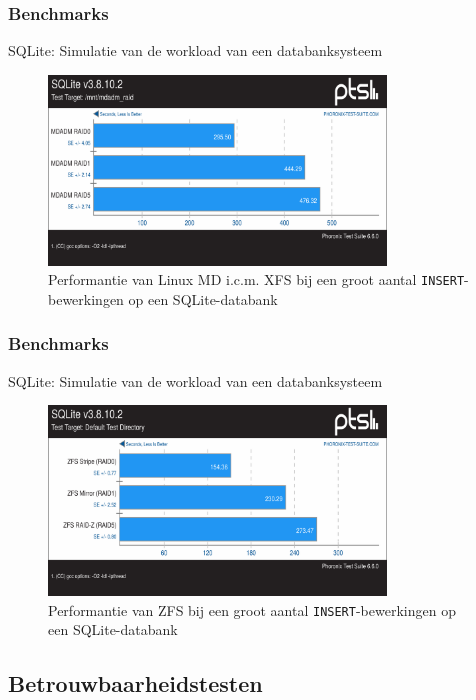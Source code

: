\documentclass{beamer}
\begin{document}
\begin{frame}
  \frametitle{Benchmarks}
  SQLite: Simulatie van de workload van een databanksysteem  
  \begin{figure}
    \centering
    \includegraphics[width=0.8\textwidth]{img/Testen/SQLite/sqlite-md.png}
    \caption{Performantie van Linux MD i.c.m. XFS bij een groot aantal \texttt{INSERT}-bewerkingen op een SQLite-databank}
  \end{figure}
\end{frame}



\begin{frame}
  \frametitle{Benchmarks}
  SQLite: Simulatie van de workload van een databanksysteem  
  \begin{figure}
    \centering
    \includegraphics[width=0.8\textwidth]{img/Testen/SQLite/sqlite-zfs.png}
    \caption{Performantie van ZFS bij een groot aantal \texttt{INSERT}-bewerkingen op een SQLite-databank}
  \end{figure}
\end{frame}



\subsection{Betrouwbaarheidstesten}
\end{document}
